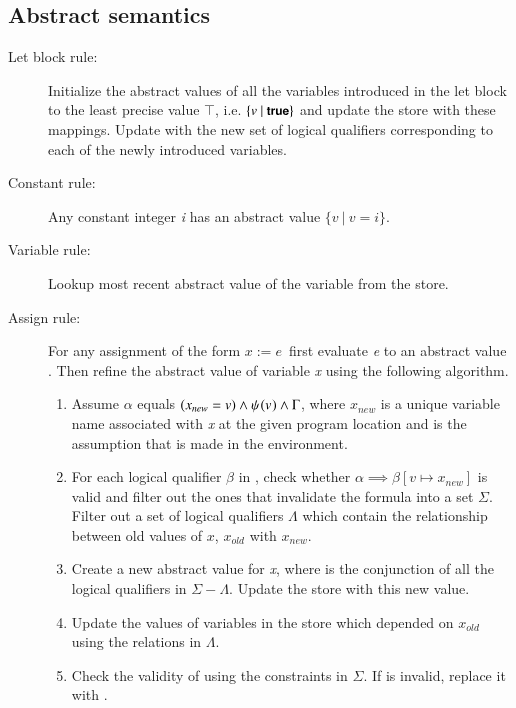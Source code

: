 \subsection{Abstract semantics}
\begin{description}


\item[Let block rule:]
Initialize the abstract values of all the variables introduced in the let block to the least precise value \ensuremath{\top}, i.e. \ensuremath{\{v\ |\ \true\}} and update the store with these mappings. Update \marketplace with the new set of logical qualifiers corresponding to each of the newly introduced variables.


\item[Constant rule:]
Any constant integer \textit{i} has an abstract value \ensuremath{\{v\ |\ v=i\}}.


\item[Variable rule:]
Lookup most recent abstract value of the variable from the store.


\item[Assign rule:]
For any assignment of the form \ensuremath{x := e}\ first evaluate \textit{e} to an abstract value \av{}{}. Then refine the abstract value of variable \textit{x} using the following algorithm.
\begin{enumerate}
\item
Assume \ensuremath{\alpha} equals $(x_{new} = v) \wedge \psi_{}(v_{}) \wedge \Gamma$, where $x_{new}$ is a unique variable name associated with \textit{x} at the given program location and \EA is the assumption that is made in the environment.
\item
For each logical qualifier \ensuremath{\beta} in \marketplace, check whether \ensuremath{\alpha \implies \beta[v\mapsto x_{new}]} is valid and filter out the ones that invalidate the formula into a set $\Sigma$. Filter out a set of logical qualifiers $\Lambda$ which contain the relationship between old values of $x$, $x_{old}$ with $x_{new}$.
\item
Create a new abstract value  for \textit{x}, where  is the conjunction of all the logical qualifiers in $\Sigma - \Lambda$. Update the store with this new value.
\item
Update the values of variables in the store which depended on $x_{old}$ using the relations in $\Lambda$.
\item
Check the validity of \EA using the constraints in $\Sigma$. If \EA is invalid, replace it with \true.
\end{enumerate}



\end{description}
